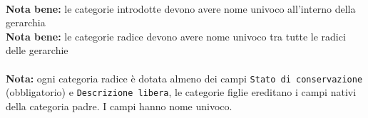 \begin{minipage}{\textwidth}
{{\begin{tabular}{l}
                \end{tabular}
            } \\
        }
        \vspace{0.5cm}
    \textbf{Nota bene:} le categorie introdotte devono avere nome univoco all'interno della gerarchia\\
    \textbf{Nota bene:} le categorie radice devono avere nome univoco tra tutte le radici delle gerarchie\\\\
    \textbf{Nota:} ogni categoria radice è dotata almeno dei campi \texttt{Stato di conservazione} (obbligatorio) e \texttt{Descrizione libera},
    le categorie figlie ereditano i campi nativi della categoria padre. I campi hanno nome univoco.
\end{minipage}